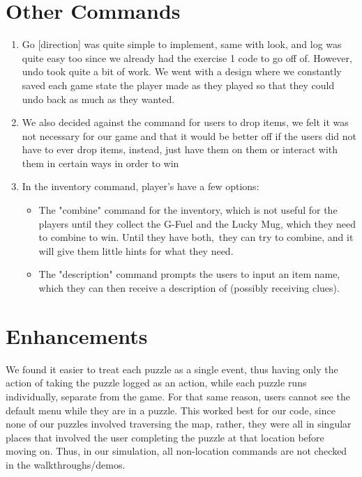 \documentclass[11pt]{article}
\begin{document}
\section*{Other Commands}
\begin{enumerate}
\item Go [direction] was quite simple to implement, same with look, and log was quite easy too since we already had the exercise 1 code to go off of. However, undo took quite a bit of work. We went with a design where we constantly saved each game state the player made as they played so that they could undo back as much as they wanted.
\item We also decided against the command for users to drop items, we felt it was not necessary for our game and that it would be better off if the users did not have to ever drop items, instead, just have them on them or interact with them in certain ways in order to win
\item In the inventory command, player's have a few options:
\begin{itemize}
\item The "combine" command for the inventory, which is not useful for the players until they collect the G-Fuel and the Lucky Mug, which they need to combine to win. Until they have both, they can try to combine, and it will give them little hints for what they need.
\item The "description" command prompts the users to input an item name, which they can then receive a description of (possibly receiving clues).
\end{itemize}
\end{enumerate}

\section*{Enhancements}
We found it easier to treat each puzzle as a single event, thus having only the action of taking the puzzle logged as an action, while each puzzle runs individually, separate from the game. For that same reason, users cannot see the default menu while they are in a puzzle. This worked best for our code, since none of our puzzles involved traversing the map, rather, they were all in singular places that involved the user completing the puzzle at that location before moving on. Thus, in our simulation, all non-location commands are not checked in the walkthroughs/demos.
\end{document}
